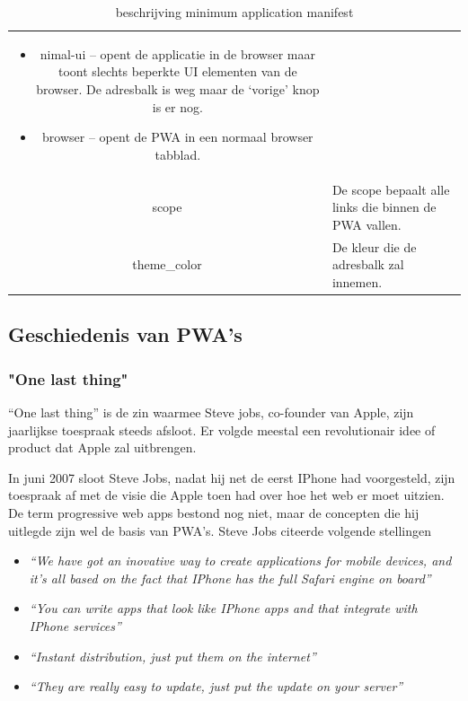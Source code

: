 \begin{table}[H]
\begin{tabular}{cp{12cm}}
\begin{itemize}
			     		  \item nimal-ui – opent de applicatie in de browser maar toont slechts beperkte UI elementen van de browser. De adresbalk is weg maar de ‘vorige’ knop is er nog.
			     		  \item browser – opent de PWA in een normaal browser tabblad.
		     		\end{itemize} \\
	     		scope & De scope bepaalt alle links die binnen de PWA vallen. \\
	     		theme\_color & De kleur die de adresbalk zal innemen.
			\end{tabular}	
			\caption{beschrijving minimum application manifest}
		\end{table}
				
			
	
	
	\autocite{LePage2020}

\subsection{Geschiedenis van PWA's}

	\subsubsection{"One last thing"}
	
		 “One last thing” is de zin waarmee Steve jobs, co-founder van Apple, zijn jaarlijkse toespraak steeds afsloot. Er volgde meestal een revolutionair idee of product dat Apple zal uitbrengen.
		
		In juni 2007 sloot Steve Jobs, nadat hij net de eerst IPhone had voorgesteld, zijn toespraak af met de visie die Apple toen had over hoe het web er moet uitzien. De term progressive web apps bestond nog niet, maar de concepten die hij uitlegde zijn wel de basis van PWA’s. Steve Jobs citeerde volgende stellingen
	
		
		\begin{itemize}
			\item \textit{ “We have got an inovative way to create applications for mobile devices, and it’s all based on the fact that IPhone has the full Safari engine on board”}
			\item \textit{ “You can write apps that look like IPhone apps and that integrate with IPhone services”}
			\item \textit{ “Instant distribution, just put them on the internet”}
			\item \textit{ “They are really easy to update, just put the update on your server”}
		\end{itemize}
		
